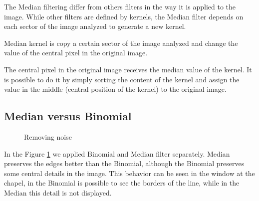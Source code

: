 \documentclass{article}
\begin{document}
		The Median filtering differ from others filters in the way it is applied to the image. While other filters are defined by kernels, the Median filter depends on each sector of the image analyzed to generate a new kernel.

		Median kernel is copy a certain sector of the image analyzed and change the value of the central pixel in the original image. 

		The central pixel in the original image receives the median value of the kernel. It is possible to do it by simply sorting the content of the kernel and assign the value in the middle (central position of the kernel) to the original image. 

	\subsection{Median versus Binomial}

		\begin{figure}[H]
		  \centering
		  \caption{Removing noise}
		  \label{fig:removingnoise}
		\end{figure}		

	In the Figure \ref{fig:removingnoise} we applied Binomial and Median filter separately. 
	Median preserves the edges better than the Binomial, although the Binomial preserves some central details in the image. 
	This behavior can be seen in the window at the chapel, in the Binomial is possible to see the borders of the line, while in the Median this detail is not displayed. 
\end{document}

